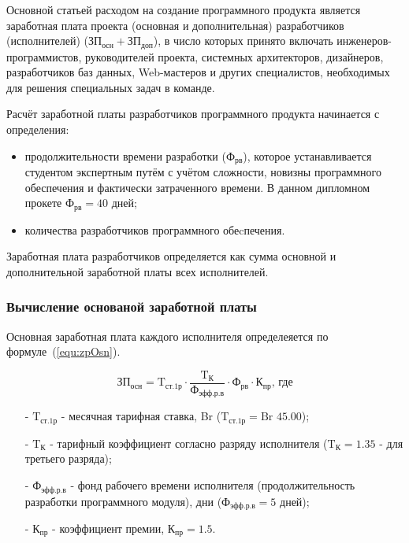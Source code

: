 Основной статьей расходом на создание программного продукта является заработная плата проекта
(основная и дополнительная) разработчиков (исполнителей)
($\text{ЗП}_{\text{осн}} + \text{ЗП}_{\text{доп}}$),
в число которых принято включать инженеров-программистов,
руководителей проекта, системных архитекторов, дизайнеров, разработчиков баз данных,
Web-мастеров и других специалистов, необходимых для решения специальных задач в команде.

Расчёт заработной платы разработчиков программного продукта начинается с определения:

\begin{itemize}
    \item продолжительности времени разработки ($\text{Ф}_{\text{рв}}$),
    которое устанавливается студентом экспертным путём с учётом сложности,
    новизны программного обеспечения и фактически затраченного времени.
    В данном дипломном прокете $\text{Ф}_{\text{рв}} = 40\text{ дней}$;
    \item количества разработчиков программного обеcпечения.
\end{itemize}

Заработная плата разработчиков определяется как сумма основной и дополнительной заработной платы всех исполнителей.

\subsubsection*{Вычисление основаной заработной платы}

Основная заработная плата каждого исполнителя определеяется по формуле~(\ref{equ:zpOsn}).

\begin{equation}
    \label{equ:zpOsn}
    \text{ЗП}_\text{осн} = \text{T}_\text{ст.1р} \cdot \frac{ \text{T}_\text{К} }{ \text{Ф}_\text{эфф.р.в} } \cdot \text{Ф}_\text{рв} \cdot \text{К}_\text{пр} \text{, где}
\end{equation}

\begin{enumerate}
    \item[-] $\text{T}_\text{ст.1р}$ - месячная тарифная ставка, Br
    ($\text{T}_\text{ст.1р} = \text{Br } 45.00$);
    \item[-] $\text{T}_\text{К}$ - тарифный коэффициент согласно разряду исполнителя \cite{RBMesTarifStavka2019} \cite{RBMesTarifStavka2023}
    ($\text{T}_\text{К} = 1.35$ - для третьего разряда);
    \item[-] $\text{Ф}_\text{эфф.р.в}$ - фонд рабочего времени исполнителя (продолжительность разработки программного модуля), дни
    ($\text{Ф}_\text{эфф.р.в} = 5\text{ дней}$);
    \item[-] $\text{К}_\text{пр}$ - коэффициент премии, $\text{К}_\text{пр} = 1.5$.
\end{enumerate}

